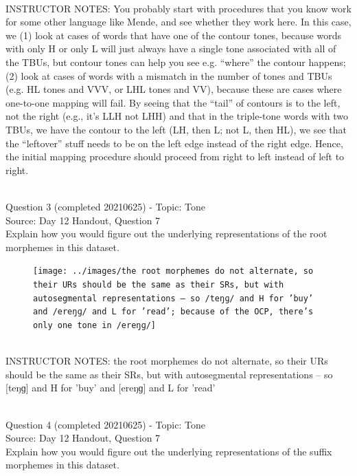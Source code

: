 \documentclass[12pt]{article}
\begin{document}
~\\
INSTRUCTOR NOTES: You probably start with procedures that you know work for some other language like Mende, and see whether they work here. In this case, we (1) look at cases of words that have one of the contour tones, because words with only H or only L will just always have a single tone associated with all of the TBUs, but contour tones can help you see e.g. “where” the contour happens; (2) look at cases of words with a mismatch in the number of tones and TBUs (e.g. HL tones and VVV, or LHL tones and VV), because these are cases where one-to-one mapping will fail. By seeing that the “tail” of contours is to the left, not the right (e.g., it’s LLH not LHH) and that in the triple-tone words with two TBUs, we have the contour to the left (LH, then L; not L, then HL), we see that the “leftover” stuff needs to be on the left edge instead of the right edge. Hence, the initial mapping procedure should proceed from right to left instead of left to right.


~\\

{\large Question 3} (completed 20210625) - Topic: Tone\\
Source: Day 12 Handout, Question 7\\

Explain how you would figure out the underlying representations of the root morphemes in this dataset.\\

\begin{figure}[H]
\texttt{[image: ../images/the root morphemes do not alternate, so their URs should be the same as their SRs, but with autosegmental representations -- so /teŋɡ/ and H for 'buy' and /ereŋɡ/ and L for 'read'; because of the OCP, there's only one tone in /ereŋɡ/]}
\end{figure}

~\\
INSTRUCTOR NOTES: the root morphemes do not alternate, so their URs should be the same as their SRs, but with autosegmental representations -- so [teŋɡ] and H for 'buy' and [ereŋɡ] and L for 'read' 


~\\

{\large Question 4} (completed 20210625) - Topic: Tone\\
Source: Day 12 Handout, Question 7\\

Explain how you would figure out the underlying representations of the suffix morphemes in this dataset.\\
\end{document}
